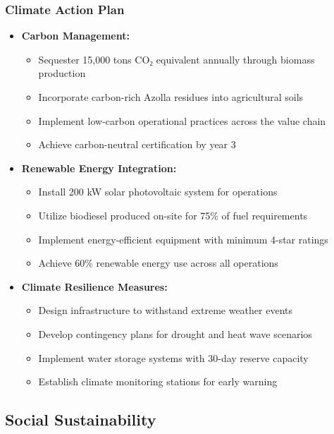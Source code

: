\subsubsection{Climate Action Plan}
\begin{itemize}
    \item \textbf{Carbon Management:}
    \begin{itemize}
        \item Sequester 15,000 tons CO₂ equivalent annually through biomass production
        \item Incorporate carbon-rich Azolla residues into agricultural soils
        \item Implement low-carbon operational practices across the value chain
        \item Achieve carbon-neutral certification by year 3
    \end{itemize}
    
    \item \textbf{Renewable Energy Integration:}
    \begin{itemize}
        \item Install 200 kW solar photovoltaic system for operations
        \item Utilize biodiesel produced on-site for 75\% of fuel requirements
        \item Implement energy-efficient equipment with minimum 4-star ratings
        \item Achieve 60\% renewable energy use across all operations
    \end{itemize}
    
    \item \textbf{Climate Resilience Measures:}
    \begin{itemize}
        \item Design infrastructure to withstand extreme weather events
        \item Develop contingency plans for drought and heat wave scenarios
        \item Implement water storage systems with 30-day reserve capacity
        \item Establish climate monitoring stations for early warning
    \end{itemize}
\end{itemize}

\subsection{Social Sustainability}

